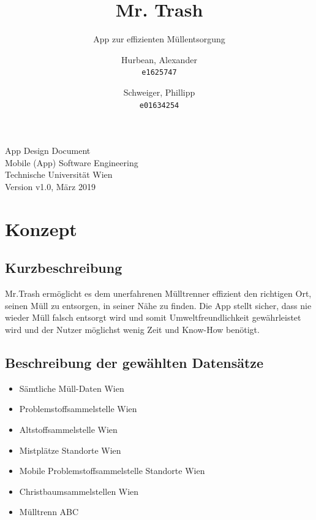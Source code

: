 \documentclass[a4paper]{scrreprt}
\title{Mr. Trash}
\subtitle{App zur effizienten Müllentsorgung}
\author{
    Hurbean, Alexander\\
    \texttt{e1625747}
    \and
    Schweiger, Phillipp\\
    \texttt{e01634254}}
\begin{document}
\maketitle

\null\vfill
\noindent
App Design Document\\ 
Mobile (App) Software Engineering\\
Technische Universität Wien\\
Version v1.0, März 2019\\
\newpage


\tableofcontents

\chapter{Konzept}

\section{Kurzbeschreibung}
Mr.Trash ermöglicht es dem unerfahrenen Mülltrenner effizient den richtigen Ort, seinen Müll zu entsorgen, in seiner Nähe zu finden. Die App stellt sicher, dass nie wieder Müll falsch entsorgt wird und somit Umweltfreundlichkeit gewährleistet wird und der Nutzer möglichst wenig Zeit und Know-How benötigt.

\section{Beschreibung der gewählten Datensätze}
\begin{itemize}
	\item Sämtliche Müll-Daten Wien \cite{alleMuell}
	\item Problemstoffsammelstelle Wien \cite{problemstoffsammelstellen}
	\item Altstoffsammelstelle Wien \cite{alstoffsammelstellen}
	\item Mistplätze Standorte Wien \cite{mistplaetze}
	\item Mobile Problemstoffsammelstelle Standorte Wien \cite{mobileProblemstoffsmst}
	\item Christbaumsammelstellen Wien \cite{christbaumsammelstellen}
	\item Mülltrenn ABC \cite{muelltrennabc}
\end{itemize}
\end{document}
